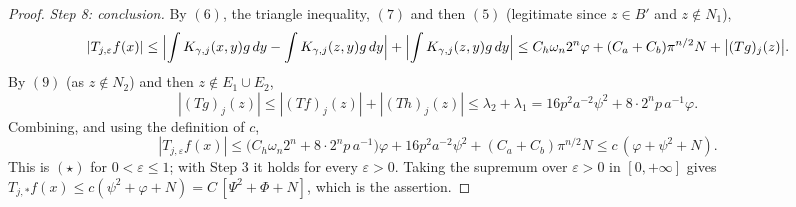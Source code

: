 \begin{proof}
\emph{Step 8: conclusion.}
By $(6)$, the triangle inequality, $(7)$ and then $(5)$ (legitimate since
$z \in B'$ and $z \notin N_1$),
\[
  |T_{j,\varepsilon}f(x)|
    \leq \Bigl|\int K_{\gamma,j}(x,y)g\,dy - \int K_{\gamma,j}(z,y)g\,dy\Bigr|
      + \Bigl|\int K_{\gamma,j}(z,y)g\,dy\Bigr|
    \leq C_h\omega_n2^n\varphi + (C_a+C_b)\pi^{n/2}N + \bigl|(Tg)_j(z)\bigr| .
\]
By $(9)$ (as $z \notin N_2$) and then $z \notin E_1 \cup E_2$,
\[
  |(Tg)_j(z)| \leq |(Tf)_j(z)| + |(Th)_j(z)| \leq \lambda_2 + \lambda_1
    = 16p^2a^{-2}\psi^2 + 8\cdot2^np\,a^{-1}\varphi .
\]
Combining, and using the definition of $c$,
\[
  |T_{j,\varepsilon}f(x)|
    \leq \bigl(C_h\omega_n2^n + 8\cdot2^np\,a^{-1}\bigr)\varphi
      + 16p^2a^{-2}\psi^2 + (C_a+C_b)\pi^{n/2}N
    \leq c\,(\varphi + \psi^2 + N) .
\]
This is $(\star)$ for $0 < \varepsilon \leq 1$; with Step 3 it holds for every
$\varepsilon > 0$.  Taking the supremum over $\varepsilon > 0$ in
$[0,+\infty]$ gives
$T_{j,*}f(x) \leq c(\psi^2 + \varphi + N) = C\,[\Psi^2 + \Phi + N]$, which is
the assertion.
%
\end{proof}
